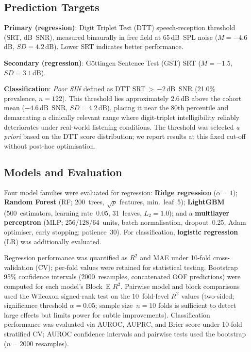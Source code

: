 \documentclass[12pt,a4paper]{article}
\begin{document}
\subsection{Prediction Targets}

\textbf{Primary (regression)}: Digit Triplet Test (DTT) speech-reception
threshold (SRT, dB~SNR), measured binaurally in free field at 65\,dB~SPL
noise ($M=-4.6$\,dB, $SD=4.2$\,dB).  Lower SRT indicates better performance.

\textbf{Secondary (regression)}: G\"{o}ttingen Sentence Test (GST) SRT
($M=-1.5$, $SD=3.1$\,dB).

\textbf{Classification}: \textit{Poor SIN} defined as DTT
SRT\,$>$\,$-2$\,dB~SNR (21.0\% prevalence, $n=122$).  This threshold lies
approximately 2.6\,dB above the cohort mean ($-4.6$\,dB~SNR, $SD=4.2$\,dB),
placing it near the 80th percentile and demarcating a clinically relevant
range where digit-triplet intelligibility reliably deteriorates under
real-world listening conditions.  The threshold was selected \emph{a priori}
based on the DTT score distribution; we report results at this fixed cut-off
without post-hoc optimisation.

\subsection{Models and Evaluation}

Four model families were evaluated for regression: \textbf{Ridge regression}
($\alpha=1$); \textbf{Random Forest} (RF; 200~trees, $\sqrt{p}$ features,
min.~leaf~5); \textbf{LightGBM} (500~estimators, learning rate~0.05,
31~leaves, $L_2=1.0$); and a \textbf{multilayer perceptron} (MLP;
256/128/64~units, batch normalisation, dropout~0.25, Adam optimiser,
early stopping; patience~30).  For classification, \textbf{logistic
regression} (LR) was additionally evaluated.

Regression performance was quantified as $R^2$ and MAE under 10-fold
cross-validation (CV); per-fold values were retained for statistical testing.
Bootstrap 95\% confidence intervals (2000~resamples, concatenated OOF
predictions) were computed for each model's Block~E $R^2$.  Pairwise model
and block comparisons used the Wilcoxon signed-rank test on the 10~fold-level
$R^2$ values (two-sided; significance threshold $\alpha=0.05$; sample
size~$n=10$ folds is sufficient to detect large effects but limits power
for subtle improvements).  Classification performance was evaluated via
AUROC, AUPRC, and Brier score under 10-fold stratified CV; AUROC confidence
intervals and pairwise tests used the bootstrap ($n=2000$ resamples).
\end{document}
